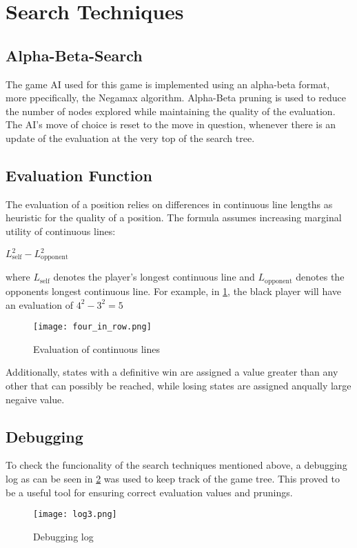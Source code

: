 \section{Search Techniques}

\subsection{Alpha-Beta-Search}
The game AI used for this game is implemented using an alpha-beta format, more ppecifically, the Negamax algorithm. Alpha-Beta pruning is used to reduce the number of nodes explored while maintaining the quality of the evaluation. The AI's move of choice is reset to the move in question, whenever there is an update of the evaluation at the very top of the search tree.

\subsection{Evaluation Function}
The evaluation of a position relies on differences in continuous line lengths as heuristic for the quality of a position. The formula  assumes increasing marginal utility of continuous lines:

\begin{center}
    \begin{math}
        L_\mathrm{self}^2 - L_\mathrm{opponent}^2
    \end{math}
\end{center}

where $L_\mathrm{self}$ denotes the player's longest continuous line and $L_\mathrm{opponent}$ denotes the opponents longest continuous line. For example, in \ref{fig:evaluation}, the black player will have an evaluation of $4^2 - 3^2 = 5$

\begin{figure}[h]
    \centering
    \texttt{[image: four\_in\_row.png]}
    \caption{Evaluation of continuous lines}
    \label{fig:evaluation}
\end{figure}

Additionally, states with a definitive win are assigned a value greater than any other that can possibly be reached, while losing states are assigned anqually large negaive value.


\subsection{Debugging}
To check the funcionality of the search techniques mentioned above, a debugging log as can be seen in \ref{fig:debugging} was used to keep track of the game tree. This proved to be a useful tool for ensuring correct evaluation values and prunings.

\begin{figure}[h]
    \centering
    \texttt{[image: log3.png]}
    \caption{Debugging log}
    \label{fig:debugging}
\end{figure}  

